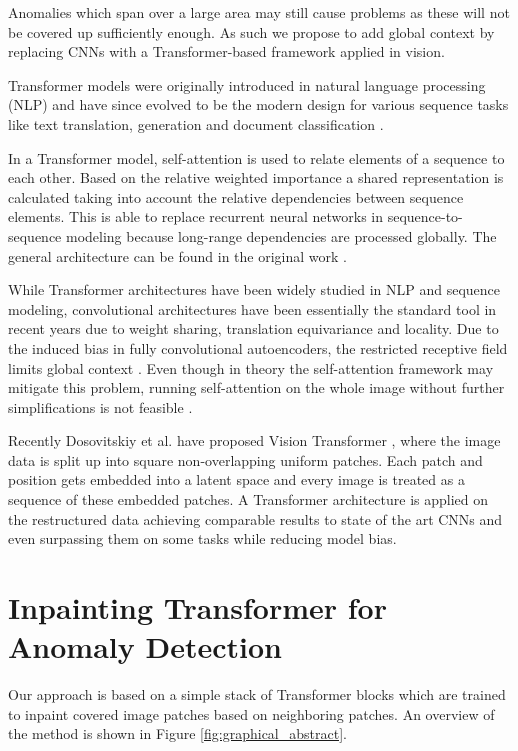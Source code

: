 \documentclass[runningheads]{llncs}
\begin{document}
Anomalies which span over a large area may still cause problems as these will not be covered up sufficiently enough.
As such we propose to add global context by replacing CNNs with a Transformer-based framework applied in vision.



Transformer models were originally introduced in natural language processing (NLP) and have since evolved to be the modern design for various sequence tasks like text translation, generation and document classification \cite{NIPS2017_3f5ee243,devlin2019bert,yang2020xlnet}.

In a Transformer model, self-attention is used to relate elements of a sequence to each other. Based on the relative weighted importance a shared representation is calculated taking into account the relative dependencies between sequence elements.
This is able to replace recurrent neural networks in sequence-to-sequence modeling because long-range dependencies are processed globally.
The general architecture can be found in the original work \cite{NIPS2017_3f5ee243}.

While Transformer architectures have been widely studied in NLP and sequence modeling, convolutional architectures have been essentially the standard tool in recent years due to weight sharing, translation equivariance and locality.
Due to the induced bias in fully convolutional autoencoders, the restricted receptive field limits global context \cite{Yu_2018_CVPR}.
Even though in theory the self-attention framework may mitigate this problem, running self-attention on the whole image without further simplifications is not feasible \cite{ho2019axial,parmar2018image}.

Recently Dosovitskiy et al. have proposed Vision Transformer \cite{dosovitskiy2020}, where the image data is split up into square non-overlapping uniform patches.
Each patch and position gets embedded into a latent space and every image is treated as a sequence of these embedded patches.
A Transformer architecture is applied on the restructured data achieving comparable results to state of the art CNNs and even surpassing them on some tasks while reducing model bias.


\section{Inpainting Transformer for Anomaly Detection}

Our approach is based on a simple stack of Transformer blocks which are trained to inpaint covered image patches based on neighboring patches. An overview of the method is shown in Figure \ref{fig:graphical_abstract}.
\end{document}
